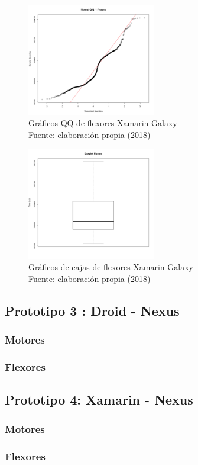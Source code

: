 \begin{figure}[H]
  \begin{center} 
   	\includegraphics[width=0.5\textwidth]{evaluation/graphics/Xamarin/Galaxy/NormalQQFlexorsXamarinGalaxy.png} 
    \caption[Gráfico QQ de flexores Xamarin-Galaxy]{Gráficos QQ de flexores Xamarin-Galaxy\\Fuente: elaboración propia (2018)} 
    \label{fig:xamarin-galaxy-QQ-flexors}
  \end{center}
\end{figure}

\begin{figure}[H]
  \begin{center} 
   	\includegraphics[width=0.5\textwidth]{evaluation/graphics/Xamarin/Galaxy/BoxplotFlexorsXamarinGalaxy.png} 
    \caption[Gráficos de cajas de flexores Xamarin-Galaxy]{Gráficos de cajas de flexores Xamarin-Galaxy\\Fuente: elaboración propia (2018)} 
    \label{fig:xamarin-galaxy-boxplot-flexors}
  \end{center}
\end{figure}


\subsection{Prototipo 3 : Droid - Nexus}

\subsubsection{Motores}

\subsubsection{Flexores}


\subsection{Prototipo 4: Xamarin - Nexus}

\subsubsection{Motores}

\subsubsection{Flexores}